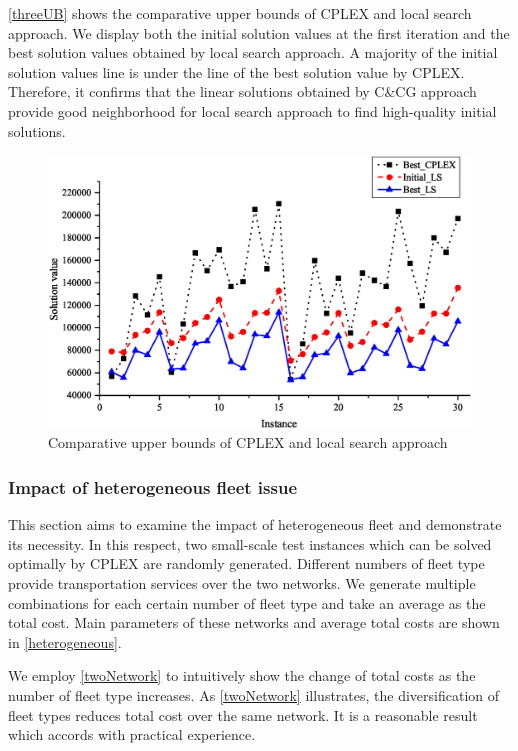 \documentclass[11pt,nonblindrev,fleqn]{article}
\begin{document}
\autoref{threeUB} shows the comparative upper bounds of CPLEX and local search approach. We display both the initial solution values at the first iteration and the best solution values obtained by local search approach. A majority of the initial solution values line is under the line of the best solution value by CPLEX. Therefore, it confirms that the linear solutions obtained by C\&CG approach provide good neighborhood for local search approach to find high-quality initial solutions.

\begin{figure}[H]
\setlength{\abovecaptionskip}{-5pt}
\setlength{\belowcaptionskip}{-5pt}
\centering
\includegraphics[width=0.9\linewidth]{F5.eps}
\caption{Comparative upper bounds of CPLEX and local search approach}
\label{threeUB}
\end{figure}

\subsubsection{Impact of heterogeneous fleet issue}
This section aims to examine the impact of heterogeneous fleet and demonstrate its necessity. In this respect, two small-scale test instances which can be solved optimally by CPLEX are randomly generated. Different numbers of fleet type provide transportation services over the two networks. We generate multiple combinations for each certain number of fleet type and take an average as the total cost. Main parameters of these networks and average total costs are shown in \autoref{heterogeneous}.

We employ \autoref{twoNetwork} to intuitively show the change of total costs as the number of fleet type increases. As \autoref{twoNetwork} illustrates, the diversification of fleet types reduces total cost over the same network. It is a reasonable result which accords with practical experience.
\end{document}
